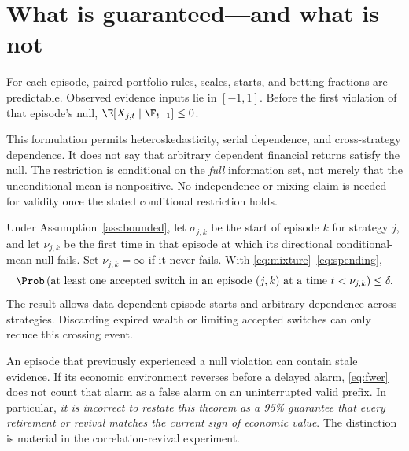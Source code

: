 \section{What is guaranteed---and what is not}\label{sec:theory}
\begin{assumption}\label{ass:bounded}
For each episode, paired portfolio rules, scales, starts, and betting fractions are predictable. Observed evidence inputs lie in $[-1,1]$. Before the first violation of that episode's null, $\E[X_{j,t}\mid\F_{t-1}]\le0$.
\end{assumption}
This formulation permits heteroskedasticity, serial dependence, and cross-strategy dependence. It does not say that arbitrary dependent financial returns satisfy the null. The restriction is conditional on the \emph{full} information set, not merely that the unconditional mean is nonpositive. No independence or mixing claim is needed for validity once the stated conditional restriction holds.

\begin{theorem}\label{thm:valid}
Under Assumption~\ref{ass:bounded}, let $\sigma_{j,k}$ be the start of episode $k$ for strategy $j$, and let $\nu_{j,k}$ be the first time in that episode at which its directional conditional-mean null fails. Set $\nu_{j,k}=\infty$ if it never fails. With \eqref{eq:mixture}--\eqref{eq:spending},
\begin{equation}\label{eq:fwer}
 \Prob\left(\text{at least one accepted switch in an episode }(j,k)
                  \text{ at a time }t<\nu_{j,k}\right)\le\delta.
\end{equation}
The result allows data-dependent episode starts and arbitrary dependence across strategies. Discarding expired wealth or limiting accepted switches can only reduce this crossing event.
\end{theorem}
An episode that previously experienced a null violation can contain stale evidence. If its economic environment reverses before a delayed alarm, \eqref{eq:fwer} does not count that alarm as a false alarm on an uninterrupted valid prefix. In particular, \emph{it is incorrect to restate this theorem as a 95\% guarantee that every retirement or revival matches the current sign of economic value}. The distinction is material in the correlation-revival experiment.


